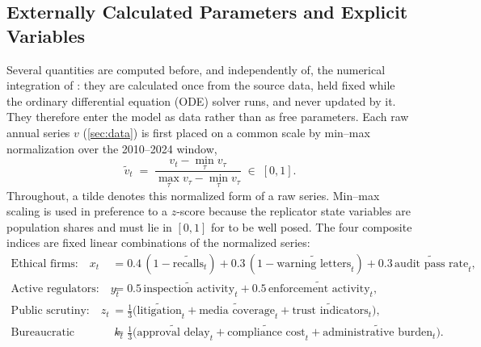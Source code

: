 \documentclass[10pt]{article}
\begin{document}
\subsection{Externally Calculated Parameters and Explicit Variables}\label{sec:params}
Several quantities are computed before, and independently of, the numerical integration of : they are calculated once from the source data, held fixed while the ordinary differential equation (ODE) solver runs, and never updated by it. They therefore enter the model as data rather than as free parameters. Each raw annual series $v$ (\cref{sec:data}) is first placed on a common scale by min--max normalization over the 2010--2024 window,
\begin{equation}
\tilde{v}_t \;=\; \frac{v_t - \min_\tau v_\tau}{\max_\tau v_\tau - \min_\tau v_\tau} \;\in\; [0,1].
\label{eq:minmax}
\end{equation}
Throughout, a tilde denotes this normalized form of a raw series. Min--max scaling is used in preference to a $z$-score because the replicator state variables are population shares and must lie in $[0,1]$ for  to be well posed. The four composite indices are fixed linear combinations of the normalized series:
\begin{align}
\text{Ethical firms:}\quad x_t &= 0.4\,(1-\widetilde{\text{recalls}}_t) + 0.3\,(1-\widetilde{\text{warning letters}}_t) + 0.3\,\widetilde{\text{audit pass rate}}_t, \label{eq:xidx}\\
\text{Active regulators:}\quad y_t &= 0.5\,\widetilde{\text{inspection activity}}_t + 0.5\,\widetilde{\text{enforcement activity}}_t, \label{eq:yidx}\\
\text{Public scrutiny:}\quad z_t &= \tfrac{1}{3}\big(\widetilde{\text{litigation}}_t + \widetilde{\text{media coverage}}_t + \widetilde{\text{trust indicators}}_t\big), \label{eq:zidx}\\
\text{Bureaucratic friction:}\quad k_t &= \tfrac{1}{3}\big(\widetilde{\text{approval delay}}_t + \widetilde{\text{compliance cost}}_t + \widetilde{\text{administrative burden}}_t\big). \label{eq:kidx}
\end{align}
\end{document}
